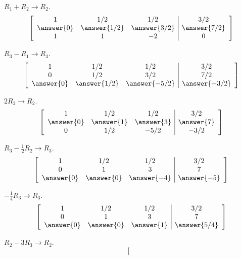 \documentclass{ximera}
\begin{document}
\begin{problem}
 \begin{problem} 
 \begin{prompt} $R_1+R_2\rightarrow R_2$.
$$ \left[\begin{array}{ccc|c}  1&1/2&1/2&3/2\\\answer{0}&\answer{1/2}&\answer{3/2}&\answer{7/2}\\1&1&-2&0
  \end{array}\right]$$
 \end{prompt}
 \begin{problem}
 \begin{prompt} $R_3-R_1\rightarrow R_3$.
$$ \left[\begin{array}{ccc|c}   1&1/2&1/2&3/2\\0&1/2&3/2&7/2\\\answer{0}&\answer{1/2}&\answer{-5/2}&\answer{-3/2}
  \end{array}\right]$$
 \end{prompt}
  \begin{problem}
  \begin{prompt} $2R_2\rightarrow R_2$.
$$ \left[\begin{array}{ccc|c}   1&1/2&1/2&3/2\\\answer{0}&\answer{1}&\answer{3}&\answer{7}\\0&1/2&-5/2&-3/2
 \end{array}\right]$$
\end{prompt}
 \begin{problem}
 \begin{prompt} $R_3-\frac{1}{2}R_2\rightarrow R_3$.
$$ \left[\begin{array}{ccc|c}  
1&1/2&1/2&3/2\\0&1&3&7\\\answer{0}&\answer{0}&\answer{-4}&\answer{-5}
  \end{array}\right]$$
 \end{prompt}
 \begin{problem}
 \begin{prompt} $-\frac{1}{4}R_3\rightarrow R_3$.
$$\left[\begin{array}{ccc|c}    1&1/2&1/2&3/2\\0&1&3&7\\\answer{0}&\answer{0}&\answer{1}&\answer{5/4}
  \end{array}\right]$$
 \end{prompt}
 \begin{problem}
 \begin{prompt} $R_2-3R_3\rightarrow R_2$.
$$ \left[\begin{array}{ccc|c}  

\end{array}$$
\end{prompt}
\end{problem}
\end{problem}
\end{problem}
\end{problem}
\end{problem}
\end{problem}
\end{problem}
\end{document}
